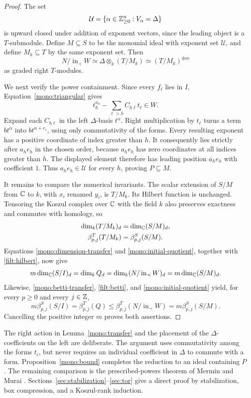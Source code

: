\begin{proof}
The set
\[
          \mathcal U=\{\alpha\in\mathbb Z_{\geq0}^n:V_\alpha=\Delta\}
\]
is upward closed under addition of exponent vectors, since the leading
object is a $T$-submodule.  Define $M\subseteq S$ to be the monomial
ideal with exponent set $\mathcal U$, and define
$M_k\subseteq T$ by the same exponent set.  Then
\begin{equation}
 N/\operatorname{in}_{\prec}W
       \simeq\Delta\otimes_k(T/M_k)
       \simeq(T/M_k)^{\oplus m}
 \label{mono:initial-quotient}
\end{equation}
as graded right $T$-modules.

We next verify the power containment.  Since every $f_\ell$ lies
in $I$, Equation~\eqref{mono:triangular} gives
\[
             t_h^{a_h}-\sum_{\ell>h}C_{h\ell}t_\ell\in W.
\]
Expand each $C_{h\ell}$ in the left $\Delta$-basis $t^\alpha$.
Right multiplication by $t_\ell$ turns a term $bt^\alpha$ into
$bt^{\alpha+e_\ell}$, using only commutativity of the forms.
Every resulting exponent has a positive coordinate of index greater
than $h$.  It consequently lies strictly after $a_he_h$ in the
chosen order, because $a_he_h$ has zero coordinates at all indices
greater than $h$.  The displayed element therefore has leading
position $a_he_h$ with coefficient $1$.  Thus $a_he_h\in\mathcal U$
for every $h$, proving $P\subseteq M$.

It remains to compare the numerical invariants.  The scalar extension
of $S/M$ from $\mathbb C$ to $k$, with $x_i$ renamed $y_i$, is $T/M_k$.
Its Hilbert function is unchanged.  Tensoring the Koszul complex over
$\mathbb C$ with the field $k$ also preserves exactness and commutes with
homology, so
\begin{align*}
 \dim_k(T/M_k)_d&=\dim_\mathbb C(S/M)_d,\\
 \beta^T_{p,j}(T/M_k)&=\beta^S_{p,j}(S/M).
\end{align*}
Equations \eqref{mono:dimension-transfer} and
\eqref{mono:initial-quotient}, together with
\eqref{filt:hilbert}, now give
\[
 m\dim_\mathbb C(S/I)_d
   =\dim_k Q_d
   =\dim_k(N/\operatorname{in}_{\prec}W)_d
   =m\dim_\mathbb C(S/M)_d.
\]
Likewise, \eqref{mono:betti-transfer},
\eqref{filt:betti}, and \eqref{mono:initial-quotient} yield, for
every $p\geq0$ and every $j\in\mathbb Z$,
\[
 m\beta^S_{p,j}(S/I)
  =\beta^T_{p,j}(Q)
  \leq\beta^T_{p,j}(N/\operatorname{in}_{\prec}W)
  =m\beta^S_{p,j}(S/M).
\]
Cancelling the positive integer $m$ proves both assertions.
\end{proof}

The right action in Lemma~\ref{mono:transfer} and the placement of the
$\Delta$-coefficients on the left are deliberate.  The argument uses
commutativity among the forms $t_i$, but never requires an individual
coefficient in $\Delta$ to commute with a form.  Proposition~\ref{mono:bound}
completes the reduction to an ideal containing $P$. The remaining
comparison is the prescribed-powers theorem of Mermin and Murai
\cite[Theorem~3.1]{MM}. Sections~\ref{sec:stabilization}--\ref{sec:tor}
give a direct proof by stabilization, box compression, and a Koszul-rank
induction.
